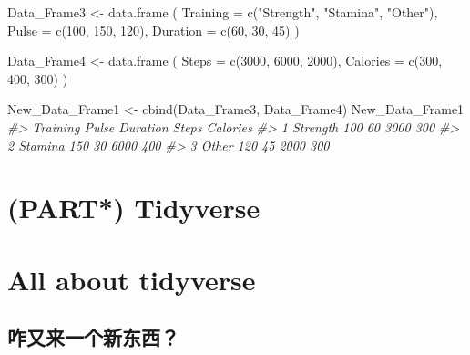 \documentclass[
]{book}
\newenvironment{Shaded}{\begin{snugshade}}{\end{snugshade}}
\newcommand{\AttributeTok}[1]{\textcolor[rgb]{0.77,0.63,0.00}{#1}}
\newcommand{\CommentTok}[1]{\textcolor[rgb]{0.56,0.35,0.01}{\textit{#1}}}
\newcommand{\DecValTok}[1]{\textcolor[rgb]{0.00,0.00,0.81}{#1}}
\newcommand{\FunctionTok}[1]{\textcolor[rgb]{0.00,0.00,0.00}{#1}}
\newcommand{\NormalTok}[1]{#1}
\newcommand{\OtherTok}[1]{\textcolor[rgb]{0.56,0.35,0.01}{#1}}
\newcommand{\StringTok}[1]{\textcolor[rgb]{0.31,0.60,0.02}{#1}}
\begin{document}
\begin{Shaded}
\begin{Highlighting}[]
\NormalTok{Data\_Frame3 }\OtherTok{\textless{}{-}} \FunctionTok{data.frame}\NormalTok{ (}
  \AttributeTok{Training =} \FunctionTok{c}\NormalTok{(}\StringTok{"Strength"}\NormalTok{, }\StringTok{"Stamina"}\NormalTok{, }\StringTok{"Other"}\NormalTok{),}
  \AttributeTok{Pulse =} \FunctionTok{c}\NormalTok{(}\DecValTok{100}\NormalTok{, }\DecValTok{150}\NormalTok{, }\DecValTok{120}\NormalTok{),}
  \AttributeTok{Duration =} \FunctionTok{c}\NormalTok{(}\DecValTok{60}\NormalTok{, }\DecValTok{30}\NormalTok{, }\DecValTok{45}\NormalTok{)}
\NormalTok{)}

\NormalTok{Data\_Frame4 }\OtherTok{\textless{}{-}} \FunctionTok{data.frame}\NormalTok{ (}
  \AttributeTok{Steps =} \FunctionTok{c}\NormalTok{(}\DecValTok{3000}\NormalTok{, }\DecValTok{6000}\NormalTok{, }\DecValTok{2000}\NormalTok{),}
  \AttributeTok{Calories =} \FunctionTok{c}\NormalTok{(}\DecValTok{300}\NormalTok{, }\DecValTok{400}\NormalTok{, }\DecValTok{300}\NormalTok{)}
\NormalTok{)}

\NormalTok{New\_Data\_Frame1 }\OtherTok{\textless{}{-}} \FunctionTok{cbind}\NormalTok{(Data\_Frame3, Data\_Frame4)}
\NormalTok{New\_Data\_Frame1}
\CommentTok{\#\textgreater{}   Training Pulse Duration Steps Calories}
\CommentTok{\#\textgreater{} 1 Strength   100       60  3000      300}
\CommentTok{\#\textgreater{} 2  Stamina   150       30  6000      400}
\CommentTok{\#\textgreater{} 3    Other   120       45  2000      300}
\end{Highlighting}
\end{Shaded}

\hypertarget{part-tidyverse}{%
\chapter{(PART*) Tidyverse}\label{part-tidyverse}}

\hypertarget{all-about-tidyverse}{%
\chapter*{All about tidyverse}\label{all-about-tidyverse}}

\hypertarget{ux548bux53c8ux6765ux4e00ux4e2aux65b0ux4e1cux897f}{%
\section{咋又来一个新东西？}\label{ux548bux53c8ux6765ux4e00ux4e2aux65b0ux4e1cux897f}}
\end{document}
